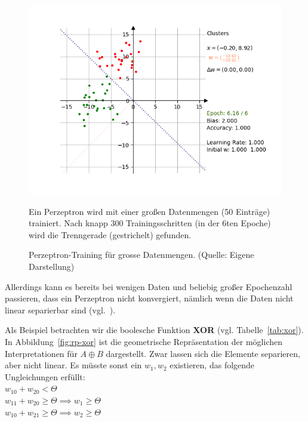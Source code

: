 \begin{figure}[h]
    \begin{center}
    \includegraphics{images/rosenblatt/blob_success.png}
    \caption{Perzeptron-Training für grosse Datenmengen. (Quelle: Eigene Darstellung)}
    \label{fig-rp-blobs}
    \end{center}
    \small Ein Perzeptron wird mit einer großen Datenmengen (50 Einträge) trainiert. Nach knapp 300 Trainingsschritten (in der 6ten Epoche) wird die Trenngerade (gestrichelt) gefunden.
\end{figure}

\noindent
Allerdings kann es bereits bei wenigen Daten und beliebig großer Epochenzahl passieren, dass ein Perzeptron nicht konvergiert, nämlich wenn die Daten nicht linear separierbar sind (vgl.~\cite[20]{Arb03}).

Als Beispiel betrachten wir die boolesche Funktion \textbf{XOR} (vgl. Tabelle~\ref{tab:xor}).
In Abbildung~\ref{fig:rp-xor} ist die geometrische Repräsentation der möglichen Interpretationen für $A \oplus B$ dargestellt.
Zwar lassen sich die Elemente separieren, aber nicht linear.
Es müsste sonst ein $w_1, w_2$ existieren, das folgende Ungleichungen erfüllt:\\


$w_10 + w_20 < \Theta$\\

$w_11 + w_20 \geq \Theta \implies w_1 \geq \Theta$\\

$w_10 + w_21 \geq \Theta \implies w_2 \geq \Theta$\\

